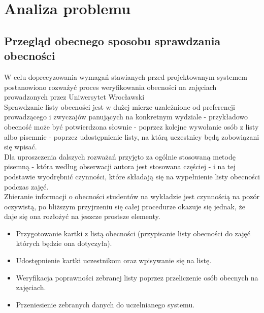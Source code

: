 \documentclass[declaration,shortabstract, mgr]{iithesis}
\begin{document}
\chapter{Analiza problemu}
\section{Przegląd obecnego sposobu sprawdzania obecności}
\indent W celu doprecyzowania wymagań stawianych przed projektowanym systemem postanowiono rozważyć proces weryfikowania obecności na zajęciach prowadzonych przez Uniwersytet Wrocławski\\
\indent Sprawdzanie listy obecności jest w dużej mierze uzależnione od preferencji prowadzącego i zwyczajów panujących na konkretnym wydziale - przykładowo obecność może być potwierdzona słownie - poprzez kolejne wywołanie osób z listy albo pisemnie - poprzez udostępnienie listy, na którą uczestnicy będą zobowiązani się wpisać.\\
\indent Dla uproszczenia dalszych rozważań przyjęto za ogólnie stosowaną metodę pisemną - która według obserwacji autora jest stosowana częściej - i na tej podstawie wyodrębnić czynności, które składają się na wypełnienie listy obecności podczas zajęć.\\
\indent Zbieranie informacji o obecności studentów na wykładzie jest czynnością na pozór oczywistą, po bliższym przyjrzeniu się całej procedurze okazuje się jednak, że daje się ona rozłożyć na jeszcze prostsze elementy. \\

\begin{itemize}
\item Przygotowanie kartki z listą obecności (przypisanie listy obecności do zajęć których będzie ona dotyczyła).
\item Udostępnienie kartki uczestnikom oraz wpisywanie się na listę.
\item Weryfikacja poprawności zebranej listy poprzez przeliczenie osób obecnych na zajęciach.
\item Przeniesienie zebranych danych do uczelnianego systemu.
\end{itemize}
\end{document}
